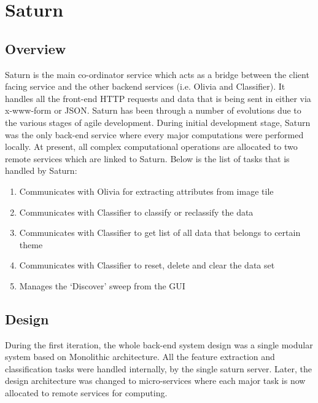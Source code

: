 \chapter{Saturn} \label{chapter:sat}
\section{Overview}
Saturn is the main co-ordinator service which acts as a bridge between the client facing service and the other backend services (i.e. Olivia and Classifier). It handles all the front-end HTTP requests and data that is being sent in either via x-www-form or JSON. Saturn has been through a number of evolutions due to the various stages of agile development. During initial development stage, Saturn was the only back-end service where every major computations were performed locally. At present, all complex computational operations are allocated to two remote services which are linked to Saturn. Below is the list of tasks that is handled by Saturn:

\begin{enumerate}
      \item Communicates with Olivia for extracting attributes from image tile
           \item  Communicates with Classifier to classify or reclassify the data
          \item Communicates with Classifier to get list of all data that belongs to certain theme
          \item   Communicates with Classifier to reset, delete and clear the data set
      \item Manages the `Discover’ sweep from the GUI
\end{enumerate}
\section{Design}
During the first iteration, the whole back-end system design was a single modular system based on Monolithic architecture. All the feature extraction and classification tasks were handled internally, by the single saturn server. Later, the design architecture was changed to micro-services where each major task is now allocated to remote services for computing. 

